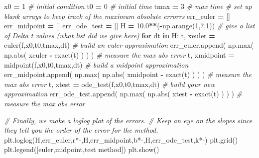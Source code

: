\documentclass[
]{book}
\newenvironment{Shaded}{\begin{snugshade}}{\end{snugshade}}
\newcommand{\BuiltInTok}[1]{#1}
\newcommand{\CommentTok}[1]{\textcolor[rgb]{0.56,0.35,0.01}{\textit{#1}}}
\newcommand{\ControlFlowTok}[1]{\textcolor[rgb]{0.13,0.29,0.53}{\textbf{#1}}}
\newcommand{\DecValTok}[1]{\textcolor[rgb]{0.00,0.00,0.81}{#1}}
\newcommand{\FloatTok}[1]{\textcolor[rgb]{0.00,0.00,0.81}{#1}}
\newcommand{\KeywordTok}[1]{\textcolor[rgb]{0.13,0.29,0.53}{\textbf{#1}}}
\newcommand{\NormalTok}[1]{#1}
\newcommand{\OperatorTok}[1]{\textcolor[rgb]{0.81,0.36,0.00}{\textbf{#1}}}
\newcommand{\StringTok}[1]{\textcolor[rgb]{0.31,0.60,0.02}{#1}}
\theoremstyle{definition}
\theoremstyle{definition}
\theoremstyle{definition}
\theoremstyle{remark}
\begin{document}
\begin{Shaded}
\begin{Highlighting}[]
\NormalTok{x0 }\OperatorTok{=} \DecValTok{1} \CommentTok{\# initial condition}
\NormalTok{t0 }\OperatorTok{=} \DecValTok{0} \CommentTok{\# initial time}
\NormalTok{tmax }\OperatorTok{=} \DecValTok{3} \CommentTok{\# max time}
\CommentTok{\# set up blank arrays to keep track of the maximum absolute errorrs}
\NormalTok{err\_euler }\OperatorTok{=}\NormalTok{ [] }
\NormalTok{err\_midpoint }\OperatorTok{=}\NormalTok{ []}
\NormalTok{err\_ode\_test }\OperatorTok{=}\NormalTok{ []}
\NormalTok{H }\OperatorTok{=} \FloatTok{10.0}\OperatorTok{**}\NormalTok{(}\OperatorTok{{-}}\NormalTok{np.arange(}\DecValTok{1}\NormalTok{,}\DecValTok{7}\NormalTok{,}\DecValTok{1}\NormalTok{)) }\CommentTok{\# give a list of Delta t values (what list did we give here)}
\ControlFlowTok{for}\NormalTok{ dt }\KeywordTok{in}\NormalTok{ H:}
\NormalTok{    t, xeuler }\OperatorTok{=}\NormalTok{ euler(f,x0,t0,tmax,dt) }\CommentTok{\# build an euler approximation}
\NormalTok{    err\_euler.append( np.}\BuiltInTok{max}\NormalTok{( np.}\BuiltInTok{abs}\NormalTok{( xeuler }\OperatorTok{{-}}\NormalTok{ exact(t) ) ) ) }\CommentTok{\# measure the max abs error}
\NormalTok{    t, xmidpoint }\OperatorTok{=}\NormalTok{ midpoint(f,x0,t0,tmax,dt) }\CommentTok{\# build a midpoint approximation}
\NormalTok{    err\_midpoint.append( np.}\BuiltInTok{max}\NormalTok{( np.}\BuiltInTok{abs}\NormalTok{( xmidpoint }\OperatorTok{{-}}\NormalTok{ exact(t) ) ) ) }\CommentTok{\# measure the max abs error}
\NormalTok{    t, xtest }\OperatorTok{=}\NormalTok{ ode\_test(f,x0,t0,tmax,dt) }\CommentTok{\# build your new approximation}
\NormalTok{    err\_ode\_test.append( np.}\BuiltInTok{max}\NormalTok{( np.}\BuiltInTok{abs}\NormalTok{( xtest }\OperatorTok{{-}}\NormalTok{ exact(t) ) ) ) }\CommentTok{\# measure the max abs error}

\CommentTok{\# Finally, we make a loglog plot of the errors.  }
\CommentTok{\# Keep an eye on the slopes since they tell you the order of the error for the method.}
\NormalTok{plt.loglog(H,err\_euler,}\StringTok{\textquotesingle{}r*{-}\textquotesingle{}}\NormalTok{,H,err\_midpoint,}\StringTok{\textquotesingle{}b*{-}\textquotesingle{}}\NormalTok{,H,err\_ode\_test,}\StringTok{\textquotesingle{}k*{-}\textquotesingle{}}\NormalTok{)}
\NormalTok{plt.grid()}
\NormalTok{plt.legend([}\StringTok{\textquotesingle{}euler\textquotesingle{}}\NormalTok{,}\StringTok{\textquotesingle{}midpoint\textquotesingle{}}\NormalTok{,}\StringTok{\textquotesingle{}test method\textquotesingle{}}\NormalTok{])}
\NormalTok{plt.show()}
\end{Highlighting}
\end{Shaded}
\end{document}
